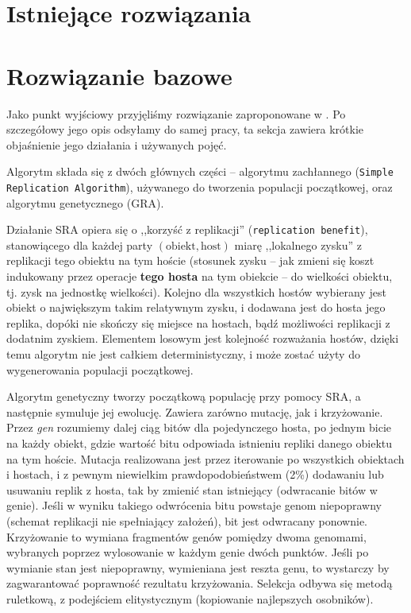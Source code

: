 \documentclass[11pt,pdftex,a4paper]{scrartcl}
\begin{document}
\section{Istniejące rozwiązania}

\section{Rozwiązanie bazowe}
Jako punkt wyjściowy przyjęliśmy rozwiązanie zaproponowane w \cite{Ahmad}. Po szczegółowy jego opis
odsyłamy do samej pracy, ta sekcja zawiera krótkie objaśnienie jego działania i używanych pojęć.

Algorytm składa się z dwóch głównych części -- algorytmu zachłannego (\texttt{Simple Replication 
Algorithm}), używanego do tworzenia populacji początkowej, oraz algorytmu genetycznego (GRA).

Działanie SRA opiera się o ,,korzyść z replikacji'' (\texttt{replication benefit}), stanowiącego
dla każdej party \((\textrm{obiekt}, \textrm{host})\) miarę ,,lokalnego zysku'' z replikacji tego
obiektu na tym hoście (stosunek zysku -- jak zmieni się koszt indukowany przez operacje 
\textbf{tego hosta} na tym obiekcie -- do wielkości obiektu, tj. zysk na jednostkę wielkości).
Kolejno dla wszystkich hostów wybierany jest obiekt o największym takim relatywnym zysku, i dodawana
jest do hosta jego replika, dopóki nie skończy się miejsce na hostach, bądź możliwości replikacji
z dodatnim zyskiem. Elementem losowym jest kolejność rozważania hostów, dzięki temu algorytm
nie jest całkiem deterministyczny, i może zostać użyty do wygenerowania populacji początkowej.

Algorytm genetyczny tworzy początkową populację przy pomocy SRA, a następnie symuluje jej ewolucję.
Zawiera zarówno mutację, jak i krzyżowanie. Przez \emph{gen} rozumiemy dalej ciąg bitów dla 
pojedynczego hosta, po jednym bicie na każdy obiekt, gdzie wartość bitu odpowiada istnieniu repliki
danego obiektu na tym hoście. Mutacja realizowana jest przez iterowanie po wszystkich obiektach 
i hostach, i z pewnym niewielkim prawdopodobieństwem (2\%) dodawaniu lub usuwaniu replik z hosta, 
tak by zmienić stan istniejący (odwracanie bitów w genie). Jeśli w wyniku takiego odwrócenia bitu
powstaje genom niepoprawny (schemat replikacji nie spełniający założeń), bit jest odwracany ponownie. 
Krzyżowanie to wymiana fragmentów genów pomiędzy dwoma genomami, wybranych poprzez wylosowanie w 
każdym genie dwóch punktów. Jeśli po wymianie stan jest niepoprawny, wymieniana jest reszta genu,
to wystarczy by zagwarantować poprawność rezultatu krzyżowania. Selekcja odbywa się metodą ruletkową,
z podejściem elitystycznym (kopiowanie najlepszych osobników).
\end{document}
